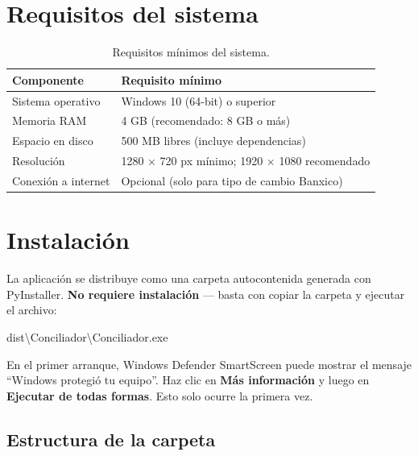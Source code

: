 \documentclass[12pt, a4paper, oneside]{report}
\begin{document}
\section{Requisitos del sistema}

\begin{table}[H]
  \centering
  \begin{tabularx}{\linewidth}{lX}
    \toprule
    \textbf{Componente} & \textbf{Requisito mínimo} \\
    \midrule
    Sistema operativo & Windows 10 (64-bit) o superior \\
    Memoria RAM       & 4 GB (recomendado: 8 GB o más) \\
    Espacio en disco  & 500 MB libres (incluye dependencias) \\
    Resolución        & 1280 × 720 px mínimo; 1920 × 1080 recomendado \\
    Conexión a internet & Opcional (solo para tipo de cambio Banxico) \\
    \bottomrule
  \end{tabularx}
  \caption{Requisitos mínimos del sistema.}
\end{table}

\section{Instalación}

La aplicación se distribuye como una carpeta autocontenida generada con
PyInstaller. \textbf{No requiere instalación} — basta con copiar la carpeta y
ejecutar el archivo:

\begin{rutabox}
dist\textbackslash{}Conciliador\textbackslash{}Conciliador.exe
\end{rutabox}

\begin{notabox}
En el primer arranque, Windows Defender SmartScreen puede mostrar el mensaje
``Windows protegió tu equipo''. Haz clic en \textbf{Más información} y luego en
\textbf{Ejecutar de todas formas}. Esto solo ocurre la primera vez.
\end{notabox}

\subsection{Estructura de la carpeta}
\end{document}
